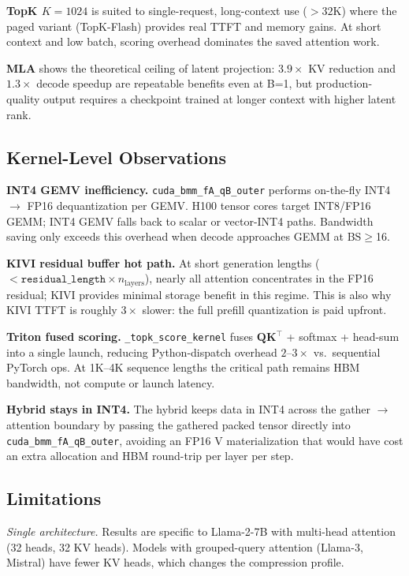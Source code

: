 \documentclass[conference]{IEEEtran}
\begin{document}
\textbf{TopK $K\!=\!1024$} is suited to single-request, long-context
use ($>32$K) where the paged variant (TopK-Flash) provides real TTFT
and memory gains.  At short context and low batch, scoring overhead
dominates the saved attention work.

\textbf{MLA} shows the theoretical ceiling of latent projection:
$3.9\times$ KV reduction and $1.3\times$ decode speedup are repeatable
benefits even at B=1, but production-quality output requires a
checkpoint trained at longer context with higher latent rank.

\subsection{Kernel-Level Observations}

\textbf{INT4 GEMV inefficiency.}  \texttt{cuda\_bmm\_fA\_qB\_outer}
performs on-the-fly INT4 $\rightarrow$ FP16 dequantization per GEMV.
H100 tensor cores target INT8/FP16 GEMM; INT4 GEMV falls back to scalar
or vector-INT4 paths.  Bandwidth saving only exceeds this overhead when
decode approaches GEMM at BS$\geq$16.

\textbf{KIVI residual buffer hot path.}  At short generation lengths
($<\!\texttt{residual\_length}\!\times\!n_\text{layers}$), nearly all
attention concentrates in the FP16 residual; KIVI provides minimal
storage benefit in this regime.  This is also why KIVI TTFT is roughly
$3\times$ slower: the full prefill quantization is paid upfront.

\textbf{Triton fused scoring.}  \texttt{\_topk\_score\_kernel} fuses
$\mathbf{Q}\mathbf{K}^\top$ + softmax + head-sum into a single launch,
reducing Python-dispatch overhead $2$--$3\times$ vs.\ sequential
PyTorch ops.  At 1K--4K sequence lengths the critical path remains HBM
bandwidth, not compute or launch latency.

\textbf{Hybrid stays in INT4.}  The hybrid keeps data in INT4 across
the gather $\rightarrow$ attention boundary by passing the gathered
packed tensor directly into \texttt{cuda\_bmm\_fA\_qB\_outer},
avoiding an FP16 V materialization that would have cost an extra
allocation and HBM round-trip per layer per step.

\subsection{Limitations}
\label{sec:limitations}

\emph{Single architecture.}  Results are specific to Llama-2-7B with
multi-head attention (32 heads, 32 KV heads).  Models with grouped-query
attention (Llama-3, Mistral) have fewer KV heads, which changes the
compression profile.
\end{document}
